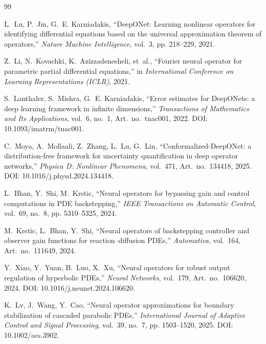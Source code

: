 \documentclass[11pt,sagev,times]{sagej}
\begin{document}
\begin{thebibliography}{99}

L.~Lu, P.~Jin, G.~E. Karniadakis,
``DeepONet: Learning nonlinear operators for identifying differential
equations based on the universal approximation theorem of operators,''
\emph{Nature Machine Intelligence}, vol.~3, pp. 218--229, 2021.

Z.~Li, N.~Kovachki, K.~Azizzadenesheli, et~al.,
``Fourier neural operator for parametric partial differential equations,''
in \emph{International Conference on Learning Representations (ICLR)}, 2021.

S.~Lanthaler, S.~Mishra, G.~E. Karniadakis,
``Error estimates for DeepONets: a deep learning framework in infinite
dimensions,''
\emph{Transactions of Mathematics and Its Applications}, vol.~6, no.~1,
Art.\ no.\ tnac001, 2022. DOI: 10.1093/imatrm/tnac001.

C.~Moya, A.~Mollaali, Z.~Zhang, L.~Lu, G.~Lin,
``Conformalized-DeepONet: a distribution-free framework for uncertainty
quantification in deep operator networks,''
\emph{Physica D: Nonlinear Phenomena}, vol.~471, Art.\ no.\ 134418, 2025.
DOI: 10.1016/j.physd.2024.134418.

L.~Bhan, Y.~Shi, M.~Krstic,
``Neural operators for bypassing gain and control computations in PDE
backstepping,''
\emph{IEEE Transactions on Automatic Control}, vol.~69, no.~8,
pp. 5310--5325, 2024.

M.~Krstic, L.~Bhan, Y.~Shi,
``Neural operators of backstepping controller and observer gain functions
for reaction--diffusion PDEs,''
\emph{Automatica}, vol.~164, Art.\ no.\ 111649, 2024.

Y.~Xiao, Y.~Yuan, B.~Luo, X.~Xu,
``Neural operators for robust output regulation of hyperbolic PDEs,''
\emph{Neural Networks}, vol.~179, Art.\ no.\ 106620, 2024.
DOI: 10.1016/j.neunet.2024.106620.

K.~Lv, J.~Wang, Y.~Cao,
``Neural operator approximations for boundary stabilization of cascaded
parabolic PDEs,''
\emph{International Journal of Adaptive Control and Signal Processing},
vol.~39, no.~7, pp. 1503--1520, 2025. DOI: 10.1002/acs.3902.


\end{thebibliography}
\end{document}
